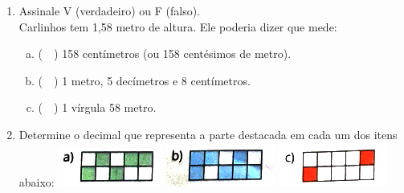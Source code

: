 \documentclass[a4paper,14pt]{article}
\begin{document}
\begin{multicols}{2}
\begin{enumerate}
        	\item Assinale V (verdadeiro) ou F (falso).\\
        	Carlinhos tem 1,58 metro de altura. Ele poderia dizer que mede:
        	\begin{enumerate}[a)]
        		\item (~~) 158 centímetros (ou 158 centésimos de metro).
        		\item (~~) 1 metro, 5 decímetros e 8 centímetros.
        		\item (~~) 1 vírgula 58 metro.
        	\end{enumerate}
        	\item Determine o decimal que representa a parte destacada em cada um dos itens abaixo:
        	\includegraphics[width=1\linewidth]{6FMA55_imagens/imagem1}
        	\includegraphics[width=1\linewidth]{6FMA55_imagens/imagem2}
        	\includegraphics[width=1\linewidth]{6FMA55_imagens/imagem3}

\end{enumerate}
\end{multicols}
\end{document}
